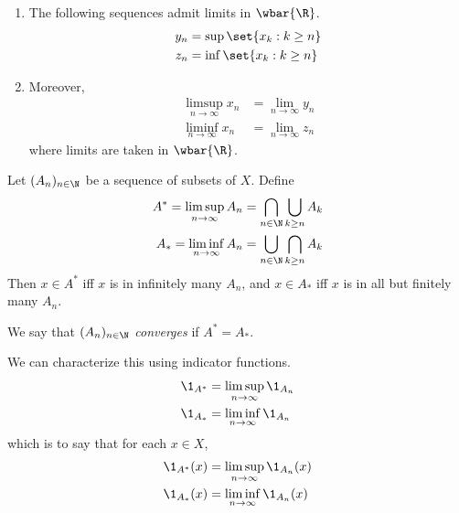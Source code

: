 \begin{theorem}
    \leavevmode
    \begin{enumerate}[label=(\arabic*)]
        \item The following sequences admit limits in $\wbar{\R}$.
        \begin{align*}
            y_n &= \sup\set{x_k : k \ge n} \\
            z_n &= \inf\set{x_k : k \ge n}
        \end{align*}
        \item Moreover, \begin{align*}
            \limsup_{n \to \infty} x_n &= \lim_{n \to \infty} y_n \\
            \liminf_{n \to \infty} x_n &= \lim_{n \to \infty} z_n
        \end{align*} where limits are taken in $\wbar{\R}$.
    \end{enumerate}
\end{theorem}
\begin{remark}
    Let $(A_n)_{n \in \N}$ be a sequence of subsets of $X$.
    Define \begin{align*}
        A^* = \limsup_{n \to \infty} A_n
            &= \bigcap_{n \in \N} \bigcup_{k \ge n} A_k \\
        A_* = \liminf_{n \to \infty} A_n
            &= \bigcup_{n \in \N} \bigcap_{k \ge n} A_k
    \end{align*}
    Then $x \in A^*$ iff $x$ is in infinitely many $A_n$,
    and $x \in A_*$ iff $x$ is in all but finitely many $A_n$.

    We say that $(A_n)_{n \in \N}$ \emph{converges} if $A^* = A_*$.

    We can characterize this using indicator functions.
    \begin{align*}
        \1_{A^*} &= \limsup_{n \to \infty} \1_{A_n} \\
        \1_{A_*} &= \liminf_{n \to \infty} \1_{A_n}
    \end{align*}
    which is to say that for each $x \in X$, \begin{align*}
        \1_{A^*}(x) &= \limsup_{n \to \infty} \1_{A_n}(x) \\
        \1_{A_*}(x) &= \liminf_{n \to \infty} \1_{A_n}(x)
    \end{align*}
\end{remark}
